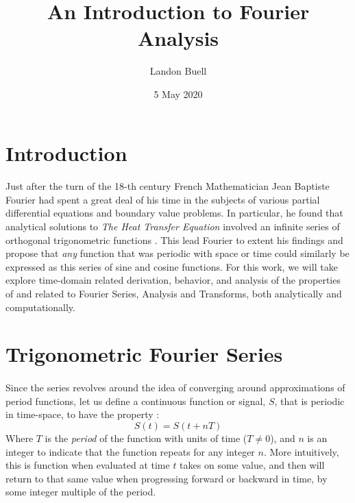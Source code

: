 \documentclass[12pt,letterpaper]{article}
\begin{document}
\title{An Introduction to Fourier Analysis}
\author{Landon Buell}
\date{5 May 2020}
\maketitle


\section*{Introduction}
\paragraph*{}Just after the turn of the 18-th century French Mathematician Jean Baptiste Fourier had spent a great deal of his time in the subjects of various partial differential equations and boundary value problems. In particular, he found that analytical solutions to \textit{The Heat Transfer Equation} involved an infinite series of orthogonal trigonometric functions \cite{Pinsky,Olver}. This lead Fourier to extent his findings and propose that \textit{any} function that was periodic with space or time could similarly be expressed as this series of sine and cosine functions. For this work, we will take explore time-domain related derivation, behavior, and analysis of the properties of and related to Fourier Series, Analysis and Transforms, both analytically and computationally.



\section*{Trigonometric Fourier Series}
\paragraph{}Since the series revolves around the idea of converging around approximations of period functions, let us define a continuous function or signal, $S$, that is periodic in time-space, to have the property \cite{Tolstov}:
\begin{equation}
\label{periodic definition}
S(t) = S(t + nT)
\end{equation}
Where $T$ is the \textit{period} of the function with units of time ($T \neq 0$), and $n$ is an integer to indicate that the function repeats for any integer $n$. More intuitively, this is function when evaluated at time $t$ takes on some value, and then will return to that same value when progressing forward or backward in time, by some integer multiple of the period. 
\end{document}
